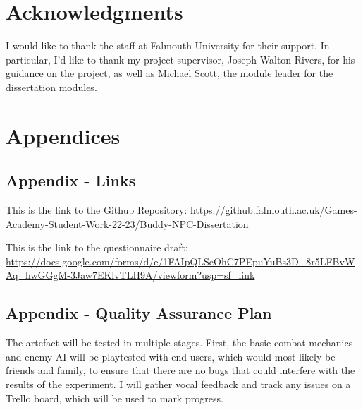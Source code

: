 \documentclass{IEEEtran}
\begin{document}
\section*{Acknowledgments}

I would like to thank the staff at Falmouth University for their support. In particular, I'd like to thank my project supervisor, Joseph Walton-Rivers, for his guidance on the project, as well as Michael Scott, the module leader for the dissertation modules.



 

\section{Appendices}
\label{Appendices}

\subsection{Appendix - Links}
\label{AppendixLinks}

This is the link to the Github Repository: \url{https://github.falmouth.ac.uk/Games-Academy-Student-Work-22-23/Buddy-NPC-Dissertation}

This is the link to the questionnaire draft: \url{https://docs.google.com/forms/d/e/1FAIpQLSeOhC7PEpuYuBs3D_8r5LFBvWAq_hwGGgM-3Jaw7EKlvTLH9A/viewform?usp=sf_link}


\subsection{Appendix - Quality Assurance Plan}
\label{AppendixQAPlan}


The artefact will be tested in multiple stages. First, the basic combat mechanics and enemy AI will be playtested with end-users, which would most likely be friends and family, to ensure that there are no bugs that could interfere with the results of the experiment. I will gather vocal feedback and track any issues on a Trello board, which will be used to mark progress.
\end{document}
